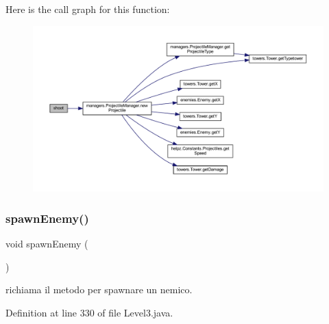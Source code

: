 Here is the call graph for this function\+:
\nopagebreak
\begin{figure}[H]
\begin{center}
\leavevmode
\includegraphics[width=350pt]{classscenes_1_1_level3_a200b073564fc341f34b6112718742bae_cgraph}
\end{center}
\end{figure}
\mbox{\label{classscenes_1_1_level3_addfc0c3129b6ff606f7276e175f31a15}} 
\subsubsection{\texorpdfstring{spawn\+Enemy()}{spawnEnemy()}}
{\footnotesize\ttfamily void spawn\+Enemy (\begin{DoxyParamCaption}{ }\end{DoxyParamCaption})\hspace{0.3cm}{\ttfamily [private]}}



richiama il metodo per spawnare un nemico. 



Definition at line 330 of file Level3.\+java.

